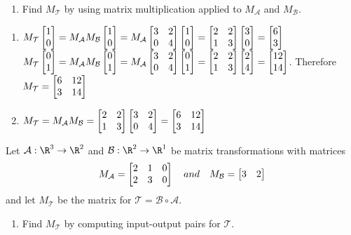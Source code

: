 \begin{exercises}
\begin{problist}
\begin{enumerate}
			\item Find $M_{\mathcal T}$ by using matrix multiplication applied
				to $M_{\mathcal A}$ and $M_{\mathcal B}$.
		\end{enumerate}
		
	    \begin{solution}
	        \begin{enumerate}
	            \item $M_{\mathcal T} \mat{1\\0} 
	            = M_{\mathcal A} M_{\mathcal B} \mat{1\\0}
	            = M_{\mathcal A} \mat{3&2\\0&4} \mat{1\\0}
	            = \mat{2&2\\1&3} \mat{3\\0} = \mat{6\\3}$
	            \\
	            $M_{\mathcal T} \mat{0\\1} 
	            = M_{\mathcal A} M_{\mathcal B} \mat{0\\1}
	            = M_{\mathcal A} \mat{3&2\\0&4} \mat{0\\1}
	            = \mat{2&2\\1&3} \mat{2\\4} = \mat{12\\14}$.
	            Therefore $M_{\mathcal T} = \mat{6&12\\3&14}$
	            
	            \item $M_{\mathcal T}
	            = M_{\mathcal A} M_{\mathcal B}
	            =  \mat{2&2\\1&3} \mat{3&2\\0&4}
	            = \mat{6&12\\3&14}$
	        \end{enumerate}
	    \end{solution}

		\prob Let $\mathcal A: \R^{3} \to \R^{2}$ and
		$\mathcal B: \R^{2} \to \R^{1}$ be matrix transformations with
		matrices
		\[
			M_{\mathcal A}= \mat{2&1&0\\2&3&0}\quad and \quad M_{\mathcal
			B}= \mat{3&2}
		\]
		 and let $M_{\mathcal T}$ be the matrix for $\mathcal T=\mathcal B\circ \mathcal A$.
		\begin{enumerate}
			\item Find $M_{\mathcal T}$ by computing input-output pairs for $\mathcal
				T$.


\end{enumerate}
\end{problist}
\end{exercises}
